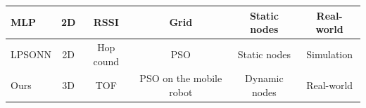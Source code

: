 \documentclass{ieeeaccess}
\begin{document}
\begin{table}[h]
\begin{tabular}{|l|l|l|l|l|l|}
		MLP\cite{kumar2016localization}& 
		\multicolumn{1}{c|}{2D}                   &      
		\multicolumn{1}{c|}{RSSI}                 &   \multicolumn{1}{c|}{Grid}                   & 
		\multicolumn{1}{c|}{Static nodes}        &   \multicolumn{1}{c|}{Real-world  \checkmark}   \\ \hline
		LPSONN\cite{banihashemian2018new}&     
		\multicolumn{1}{c|}{2D}                   &      
		\multicolumn{1}{c|}{Hop cound}                 &   \multicolumn{1}{c|}{PSO  \checkmark}                   & 
		\multicolumn{1}{c|}{Static nodes}        &   \multicolumn{1}{c|}{Simulation}   \\ \hline
		
		Ours&
		\multicolumn{1}{c|}{3D \checkmark}                   &      
		\multicolumn{1}{c|}{TOF}                 &   \multicolumn{1}{c|}{PSO on the mobile robot \checkmark}                   & 
		\multicolumn{1}{c|}{Dynamic nodes \checkmark}        &   \multicolumn{1}{c|}{Real-world \checkmark}   \\ \hline
	\end{tabular}
\end{table}
\end{document}
